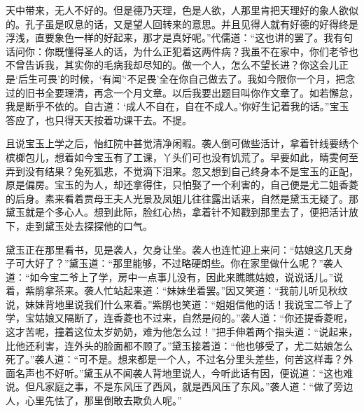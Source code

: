 \begin{parag}
天中带来，无人不好的。但是德乃天理，色是人欲，人那里肯把天理好的象人欲似的。孔子虽是叹息的话，又是望人回转来的意思。并且见得人就有好德的好得终是浮浅，直要象色一样的好起来，那才是真好呢。”代儒道：“这也讲的罢了。我有句话问你：你既懂得圣人的话，为什么正犯着这两件病？我虽不在家中，你们老爷也不曾告诉我，其实你的毛病我却尽知的。做一个人，怎么不望长进？你这会儿正是‘后生可畏’的时候，‘有闻’‘不足畏’全在你自己做去了。我如今限你一个月，把念过的旧书全要理清，再念一个月文章。以后我要出题目叫你作文章了。如若懈怠，我是断乎不依的。自古道：‘成人不自在，自在不成人。’你好生记着我的话。”宝玉答应了，也只得天天按着功课干去。不提。
\end{parag}


\begin{parag}
    且说宝玉上学之后，怡红院中甚觉清净闲暇。袭人倒可做些活计，拿着针线要绣个槟榔包儿，想着如今宝玉有了工课，丫头们可也没有饥荒了。早要如此，晴雯何至弄到没有结果？兔死狐悲，不觉滴下泪来。忽又想到自己终身本不是宝玉的正配，原是偏房。宝玉的为人，却还拿得住，只怕娶了一个利害的，自己便是尤二姐香菱的后身。素来看着贾母王夫人光景及凤姐儿往往露出话来，自然是黛玉无疑了。那黛玉就是个多心人。想到此际，脸红心热，拿着针不知戳到那里去了，便把活计放下，走到黛玉处去探探他的口气。
\end{parag}


\begin{parag}
    黛玉正在那里看书，见是袭人，欠身让坐。袭人也连忙迎上来问：“姑娘这几天身子可大好了？”黛玉道：“那里能够，不过略硬朗些。你在家里做什么呢？”袭人道：“如今宝二爷上了学，房中一点事儿没有，因此来瞧瞧姑娘，说说话儿。”说着，紫鹃拿茶来。袭人忙站起来道：“妹妹坐着罢。”因又笑道：“我前儿听见秋纹说，妹妹背地里说我们什么来着。”紫鹃也笑道：“姐姐信他的话！我说宝二爷上了学，宝姑娘又隔断了，连香菱也不过来，自然是闷的。”袭人道：“你还提香菱呢，这才苦呢，撞着这位太岁奶奶，难为他怎么过！”把手伸着两个指头道：“说起来，比他还利害，连外头的脸面都不顾了。”黛玉接着道：“他也够受了，尤二姑娘怎么死了。”袭人道：“可不是。想来都是一个人，不过名分里头差些，何苦这样毒？外面名声也不好听。”黛玉从不闻袭人背地里说人，今听此话有因，便说道：“这也难说。但凡家庭之事，不是东风压了西风，就是西风压了东风。”袭人道：“做了旁边人，心里先怯了，那里倒敢去欺负人呢。”
\end{parag}


